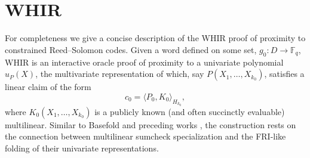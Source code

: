 \section{WHIR}
\label{s:WHIR}






For completeness we give a concise description of the WHIR \cite{WHIR} proof of proximity to constrained Reed--Solomon codes. 
Given a word defined on some set, $g_0:D\longrightarrow \mathbb F_q$, WHIR \cite{WHIR} is an interactive oracle proof of proximity to a univariate polynomial $u_P(X)$, the multivariate representation of which, say $P(X_1, \ldots, X_{k_0})$, satisfies a linear claim of the form
\begin{equation}
\label{e:WHIR:main:claim}
c_0 = \langle P_0, K_0\rangle_{H_{k_0}},
\end{equation}
where $K_0(X_1,\ldots, X_{k_0})$ is a publicly known (and often succinctly evaluable) multilinear. 
Similar to Basefold \cite{Basefold} and preceding works \cite{Gemini,Hyperplonk} \cite{DualGemini:hackmd,Zeromorph}, the construction rests on the connection between multilinear sumcheck specialization and the FRI-like folding of their univariate representations.

